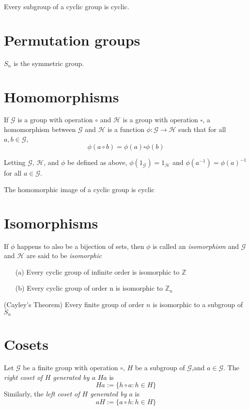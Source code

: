\theorem
Every subgroup of a cyclic group is cyclic.


\section{Permutation groups}

$S_n$ is the symmetric group.


\section{Homomorphisms}

If $\mathcal{G}$ is a group with operation $\circ$ and $\mathcal{H}$ is a group with operation $\square$, a homomorphism between $\mathcal{G}$ and $\mathcal{H}$ is a function $\phi: \mathcal{G} \to \mathcal{H}$ such that for all $a, b \in \mathcal{G}$,
\[\phi(a \circ b) = \phi(a) \square \phi(b)\]

\theorem
Letting $\mathcal{G}$, $\mathcal{H}$, and $\phi$ be defined as above, $\phi(1_\mathcal{G}) = 1_\mathcal{H}$ and $\phi(a^{-1}) = \phi(a)^{-1}$ for all $a \in \mathcal{G}$.

\theorem
The homomorphic image of a cyclic group is cyclic


\section{Isomorphisms}

If $\phi$ happens to also be a bijection of sets, then $\phi$ is called an \textit{isomorphism} and $\mathcal{G}$ and $\mathcal{H}$ are said to be \textit{isomorphic}

\theorem
\begin{itemize}
    \item[(a)]
        Every cyclic group of infinite order is isomorphic to $\mathbb{Z}$
    \item[(b)]
        Every cyclic group of order n is isomorphic to $\mathbb{Z}_n$
\end{itemize}

\theorem (Cayley's Theorem)
Every finite group of order $n$ is isomorphic to a subgroup of $S_n$


\section{Cosets}

Let $\mathcal{G}$ be a finite group with operation $\circ$, $H$ be a subgroup of $\mathcal{G}$,and $a \in \mathcal{G}$. The \textit{right coset of $H$ generated by $a$} $Ha$ is
\[Ha := \{h \circ a : h \in H\}\]
Similarly, the \textit{left coset of $H$ generated by $a$} is
\[aH := \{a \circ h : h \in H\}\]


